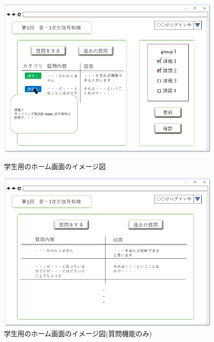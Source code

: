 \begin{figure}[htbp]
 \begin{minipage}{0.5\hsize}
  \begin{center}
   \includegraphics[width=1\linewidth,clip]{./img/28.png}
  \end{center}
  \caption{学生用のホーム画面のイメージ図　　　　　　　}\label{fig:28}
 \end{minipage}
 \begin{minipage}{0.5\hsize}
  \begin{center}
   \includegraphics[width=1\linewidth,clip]{./img/29.png}
  \end{center}
  \caption{学生用のホーム画面のイメージ図(質問機能のみ)}\label{fig:29}
 \end{minipage}
\end{figure}


